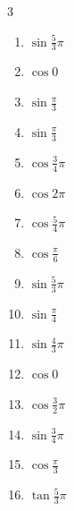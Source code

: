 \begin{multicols}{3}
\begin{enumerate}
  \item $\displaystyle \sin{\frac{5}{3}\pi}$

  \item $\displaystyle \cos{0}$
        \phantom{$\displaystyle =1$}

  \item $\displaystyle \sin{\frac{\pi}{3}}$

  \item $\displaystyle \sin{\frac{\pi}{3}}$

  \item $\displaystyle \cos{\frac{3}{4}\pi}$

  \item $\displaystyle \cos{2\pi}$
        \phantom{$\displaystyle =1$}

  \item $\displaystyle \cos{\frac{5}{4}\pi}$

  \item $\displaystyle \cos{\frac{\pi}{6}}$

  \item $\displaystyle \sin{\frac{5}{3}\pi}$

  \item $\displaystyle \sin{\frac{\pi}{4}}$

  \item $\displaystyle \sin{\frac{4}{3}\pi}$

  \item $\displaystyle \cos{0}$
        \phantom{$\displaystyle =1$}

  \item $\displaystyle \cos{\frac{3}{2}\pi}$
        \phantom{$\displaystyle =0$}

  \item $\displaystyle \sin{\frac{3}{4}\pi}$

  \item $\displaystyle \cos{\frac{\pi}{3}}$

  \item $\displaystyle \tan{\frac{5}{3}\pi}$


\end{enumerate}
\end{multicols}
